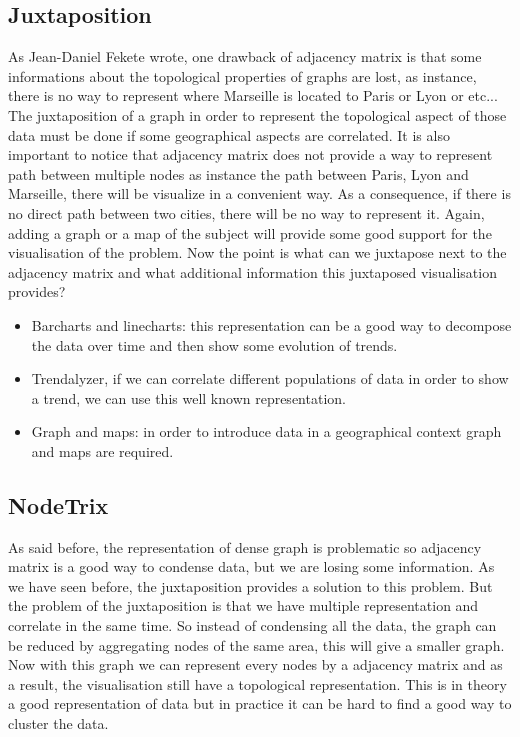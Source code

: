 \documentclass{vgtc}                          %
\begin{document}
\subsection{Juxtaposition}
As Jean-Daniel Fekete\cite{Fekete} wrote, one drawback of adjacency matrix is that some informations about the topological properties of graphs are lost, as instance, there is no way to represent where Marseille is located to Paris or Lyon or etc... The juxtaposition of a graph in order to represent the topological aspect of those data must be done if some geographical aspects are correlated. It is also important to notice that adjacency matrix does not provide a way to represent path between multiple nodes as instance the path between Paris, Lyon and Marseille, there will be visualize in a convenient way. As a consequence, if there is no direct path between two cities, there will be no way to represent it. Again, adding a graph or a map of the subject will provide some good support for the visualisation of the problem. 
Now the point is what can we juxtapose next to the adjacency matrix and what additional information this juxtaposed visualisation provides?
\begin{itemize}
\item Barcharts and linecharts: this representation can be a good way to decompose the data over time and then show some evolution of trends.
\item Trendalyzer, if we can correlate different populations of data in order to show a trend, we can use this well known representation.
\item Graph and maps: in order to introduce data in a geographical context graph and maps are required.
\end{itemize}
\subsection{NodeTrix}
As said before\cite{nodetrix}, the representation of dense graph is problematic so adjacency matrix is a good way to condense data, but we are losing some information. As we have seen before, the juxtaposition provides a solution to this problem. But the problem of the juxtaposition is that we have multiple representation and correlate in the same time. So instead of condensing all the data, the graph can be reduced by aggregating nodes of the same area, this will give a smaller graph. Now with this graph we can represent every nodes by a adjacency matrix and as a result, the visualisation still have a topological representation. This is in theory a good representation of data but in practice it can be hard to find a good way to cluster the data.
\end{document}

